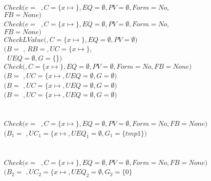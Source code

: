\begin{small}
\begin{tabbing}
\>\>\\
\>\>\>$Check(e=$~$, C=\{x \mapsto$$\},
       EQ=\emptyset,PV=\emptyset, Form = No,$\\
\>\>\>\>\>\>$FB = None)$\\
\>\>\>\>$Check(e=$~$, C=\{x \mapsto$$\},
         EQ=\emptyset,PV=\emptyset, Form = No,$\\
\>\>\>\>\>\>\>$FB = None)$\\
\>\>\>\>\>$CheckLValue($$, C = \{x \mapsto$$\}, EQ = \emptyset, PV = \emptyset)$ \\
\>\>\>\>\>\>$(B = $ , $RB = $$,
                     \mathit{UC} = \{x \mapsto$$\},$\\
\>\>\>\>\>\>~$UEQ = \emptyset, G = \{$\}$)$ \\
\>\>\>\>\>\>$Check($$,C  =\{x\mapsto$$\}, EQ = \emptyset, PV = \emptyset,
                         Form = No, FB = None)$\\
\>\>\>\>\>\>$(B = $ $, \mathit{UC} = \{x\mapsto$$ , UEQ = \emptyset,
               G = \emptyset)$\\
\>\>\>\>\>$(B = $ $, \mathit{UC} = \{x\mapsto$$ , UEQ = \emptyset,
               G = \emptyset)$\\
\>\>\>\>$(B = $ $, \mathit{UC} = \{x\mapsto$$ , UEQ = \emptyset,
          G = \emptyset)$\\  \\
\>\>\\
\>\>\>$Check(e=$~$, C=\{x \mapsto$$\},
         EQ=\emptyset,PV=\emptyset, Form = No, FB = None)$\\
\>\>\>\>$(B_1 = $ $, \mathit{UC}_1 = \{x\mapsto$$,
                {UEQ}_1 = \emptyset, G_1 = \{tmp1\})$\\

\\
\>\>\\
\>\>\>$Check(e=$~$, C=\{x \mapsto$$\},
         EQ=\emptyset,PV=\emptyset, Form = No, FB = None)$\\
\>\>\>\>$(B_2 = $ $, \mathit{UC}_2 = \{x\mapsto$$,
               {UEQ}_2 = \emptyset, G_2 = \{ 0 \}$\\ \\


\end{tabbing}
\end{small}
